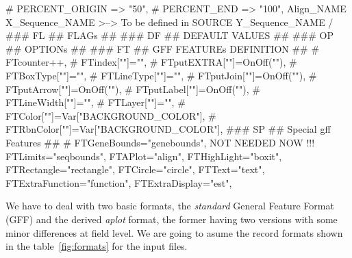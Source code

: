 \documentclass[11pt]{article}
\def\nwendcode{\endtrivlist \endgroup} %
\let\nwdocspar=\par                    %
\begin{document}
\nwenddocs{}\endmoddef
# PERCENT_ORIGIN => "50",
# PERCENT_END => "100",
Align_NAME       \\
X_Sequence_NAME   >--> To be defined in SOURCE
Y_Sequence_NAME  /
### FL ## FLAGs ##
### DF ## DEFAULT VALUES ##
### OP ## OPTIONs ##
### FT ## GFF FEATUREs DEFINITION ##
  # FTcounter++,
  # FTindex[""]="",
  # FTputEXTRA[""]=OnOff(""),
  # FTBoxType[""]="",
  # FTLineType[""]="",
  # FTputJoin[""]=OnOff(""),
  # FTputArrow[""]=OnOff(""),
  # FTputLabel[""]=OnOff(""),
  # FTLineWidth[""]="",
  # FTLayer[""]="",
  # FTColor[""]=Var["BACKGROUND_COLOR"],
  # FTRbnColor[""]=Var["BACKGROUND_COLOR"],
### SP ## Special gff Features ##
  # FTGeneBounds="genebounds", NOT NEEDED NOW !!!
  FTLimits="seqbounds",
  FTAPlot="align",
  FTHighLight="boxit",
  FTRectangle="rectangle",
  FTCircle="circle",
  FTText="text",
  FTExtraFunction="function",
  FTExtraDisplay="est",
\nwendcode{}\nwdocspar
 
\nwenddocs{}%
\nwdocspar
\nwenddocs{}%
%
%
%
\nwdocspar


\newpage


We have to deal with two basic formats, the \textsl{standard} General Feature Format (GFF) and the derived \textsl{aplot} format, the former having two versions with some minor differences at field level. We are going to asume the record formats shown in the table~\ref{fig:formats} for the input files.

\end{document}

